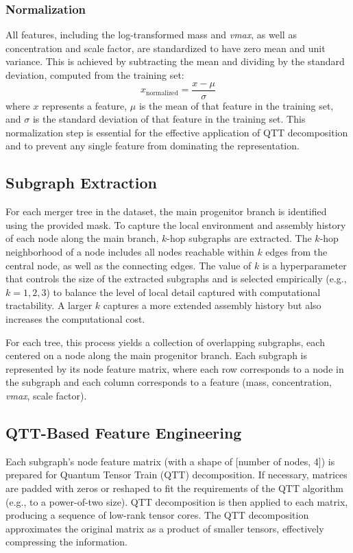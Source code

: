 \documentclass[twocolumn]{aastex631}
\begin{document}
\subsubsection{Normalization}
All features, including the log-transformed mass and \textit{vmax}, as well as concentration and scale factor, are standardized to have zero mean and unit variance. This is achieved by subtracting the mean and dividing by the standard deviation, computed from the training set:
\[
x_{\text{normalized}} = \frac{x - \mu}{\sigma}
\]
where \(x\) represents a feature, \(\mu\) is the mean of that feature in the training set, and \(\sigma\) is the standard deviation of that feature in the training set. This normalization step is essential for the effective application of QTT decomposition and to prevent any single feature from dominating the representation.

\subsection{Subgraph Extraction}

For each merger tree in the dataset, the main progenitor branch is identified using the provided mask. To capture the local environment and assembly history of each node along the main branch, \(k\)-hop subgraphs are extracted. The \(k\)-hop neighborhood of a node includes all nodes reachable within \(k\) edges from the central node, as well as the connecting edges. The value of \(k\) is a hyperparameter that controls the size of the extracted subgraphs and is selected empirically (e.g., \(k = 1, 2, 3\)) to balance the level of local detail captured with computational tractability. A larger \(k\) captures a more extended assembly history but also increases the computational cost.

For each tree, this process yields a collection of overlapping subgraphs, each centered on a node along the main progenitor branch. Each subgraph is represented by its node feature matrix, where each row corresponds to a node in the subgraph and each column corresponds to a feature (mass, concentration, \textit{vmax}, scale factor).

\subsection{QTT-Based Feature Engineering}

Each subgraph's node feature matrix (with a shape of [number of nodes, 4]) is prepared for Quantum Tensor Train (QTT) decomposition. If necessary, matrices are padded with zeros or reshaped to fit the requirements of the QTT algorithm (e.g., to a power-of-two size). QTT decomposition is then applied to each matrix, producing a sequence of low-rank tensor cores. The QTT decomposition approximates the original matrix as a product of smaller tensors, effectively compressing the information.
\end{document}
